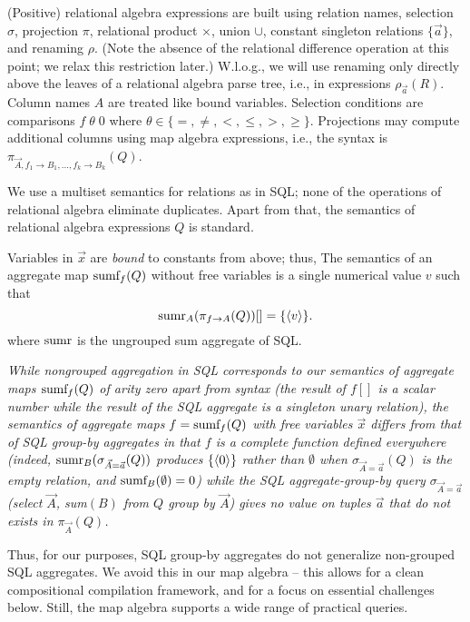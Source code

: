 (Positive) relational algebra expressions are built using relation names,
selection $\sigma$, projection $\pi$, relational product $\times$, union $\cup$,
constant singleton relations $\{\vec{a}\}$,
and renaming $\rho$.
(Note the absence of the relational difference operation at this point; we
relax this restriction later.)
W.l.o.g., we will use renaming only directly above the leaves of a relational algebra parse tree, i.e., in expressions
$\rho_{\vec{a}}(R)$.
Column names $A$ are treated like bound variables.
Selection conditions are comparisons
$f \;\theta\; 0$ where $\theta \in \{ =, \neq, <, \le, >, \ge \}$.
Projections may compute additional columns
using map algebra expressions, i.e., the syntax is
$\pi_{\vec{A}, f_1 \rightarrow B_1, \dots, f_k \rightarrow B_k}(Q)$. 

We use a multiset semantics for relations as in SQL; none of the operations
of relational algebra eliminate duplicates.
Apart from that, the semantics of relational algebra expressions $Q$ is standard.

Variables
in $\vec{x}$ are {\em bound}\/ to constants from above; thus, 
The semantics of an
aggregate map $\mbox{sumf}_f(Q)$ without free variables
is a single numerical value $v$ such that
\[
\mbox{sumr}_A(\pi_{f \rightarrow A}(Q))[] = \{ {\langle v\rangle} \}.
\]
where $\mbox{sumr}$ is the ungrouped sum aggregate of SQL.


\begin{remark}\em
While nongrouped aggregation in SQL corresponds to our semantics of aggregate
maps $\mbox{sumf}_f(Q)$ of arity zero apart from syntax (the result of $f[]$ is a scalar number
while the result of the SQL aggregate is a singleton unary relation),
the semantics of aggregate maps $f = \mbox{sumf}_f(Q)$ with
free variables $\vec{x}$ differs from that
of SQL group-by aggregates in that $f$ is a complete function defined everywhere
(indeed, $\mbox{sumr}_B(\sigma_{\vec{A}=\vec{a}}(Q))$ produces $\{{\langle0\rangle}\}$ rather
than $\emptyset$ when $\sigma_{\vec{A}=\vec{a}}(Q)$ is the empty relation, and
$\mbox{sumf}_B(\emptyset) = 0$) while
the SQL aggregate-group-by query
$\sigma_{\vec{A}=\vec{a}}$(select $\vec{A}$, sum$(B)$ from $Q$ group by $\vec{A}$)
gives no value on tuples $\vec{a}$ that do not exists in $\pi_{\vec{A}}(Q)$.

Thus, for our purposes, SQL group-by aggregates do not generalize non-grouped
SQL aggregates. We avoid this in our map algebra -- this allows for a clean
compositional compilation framework, and for a focus on essential challenges
below. Still, the map algebra supports a wide range of practical queries.
\end{remark}


